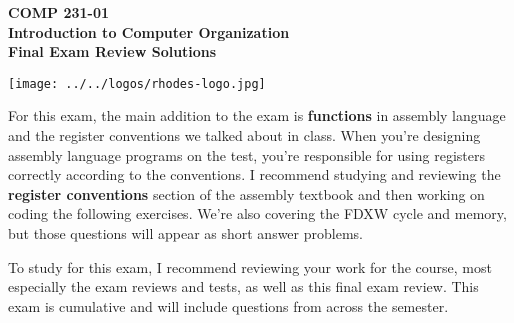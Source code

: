\documentclass[10pt]{article}
\begin{document}

\hspace{-5mm}
\begin{minipage}{0.65\linewidth}
  \textbf{
      \hspace{-3mm}
      {\Large COMP 231-01}\\
      {\Large Introduction to Computer Organization}\\
      {\Large Final Exam Review Solutions}}
\end{minipage}
\begin{minipage}{0.35\linewidth}
  \texttt{[image: ../../logos/rhodes-logo.jpg]}
\end{minipage}




For this exam, the main addition to the exam is \textbf{functions} in assembly language and the register conventions we talked about in class.  When you're designing assembly language programs on the test, you're responsible for using registers correctly according to the conventions.  I recommend studying and reviewing the \textbf{register conventions} section of the assembly textbook and then working on coding the following exercises.  We're also covering the FDXW cycle and memory, but those questions will appear as short answer problems. 

To study for this exam, I recommend reviewing your work for the course, most especially the exam reviews and tests, as well as this final exam review.  This exam is cumulative and will include questions from across the semester. 
\end{document}
